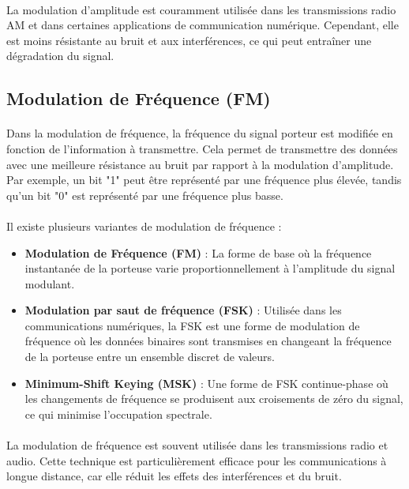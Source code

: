 \documentclass[a4paper,twocolumn]{report}
\begin{document}
\paragraph{}La modulation d'amplitude est couramment utilisée dans les transmissions radio AM et dans certaines applications de communication numérique. Cependant, elle est moins résistante au bruit et aux interférences, ce qui peut entraîner une dégradation du signal.

\subsection{Modulation de Fréquence (FM)}
\paragraph{}Dans la modulation de fréquence, la fréquence du signal porteur est modifiée en fonction de l'information à transmettre. Cela permet de transmettre des données avec une meilleure résistance au bruit par rapport à la modulation d'amplitude. Par exemple, un bit "1" peut être représenté par une fréquence plus élevée, tandis qu'un bit "0" est représenté par une fréquence plus basse. 
\paragraph{}Il existe plusieurs variantes de modulation de fréquence : 
\begin{itemize}
    \item \textbf{Modulation de Fréquence (FM)} : La forme de base où la fréquence instantanée de la porteuse varie proportionnellement à l'amplitude du signal modulant.
    \item \textbf{Modulation par saut de fréquence (FSK)} : Utilisée dans les communications numériques, la FSK est une forme de modulation de fréquence où les données binaires sont transmises en changeant la fréquence de la porteuse entre un ensemble discret de valeurs.
    \item \textbf{Minimum-Shift Keying (MSK)} : Une forme de FSK continue-phase où les changements de fréquence se produisent aux croisements de zéro du signal, ce qui minimise l'occupation spectrale.
\end{itemize}
\paragraph{}La modulation de fréquence est souvent utilisée dans les transmissions radio et audio. Cette technique est particulièrement efficace pour les communications à longue distance, car elle réduit les effets des interférences et du bruit.
\end{document}
